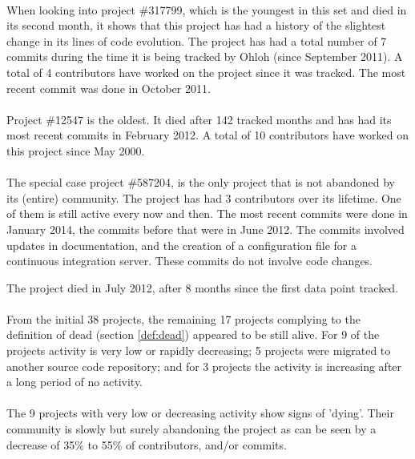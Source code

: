 \paragraph{}
When looking into project \#317799, which is the youngest in this set and died
in its second month, it shows that this project has had a history of the slightest
change in its lines of code evolution. The project has had a total number of 7
commits during the time it is being tracked by Ohloh (since September 2011). A
total of 4 contributors have worked on the project since it was tracked. The
most recent commit was done in October 2011.

\paragraph{}
Project \#12547 is the oldest. It died after 142 tracked months and has
had its most recent commits in February 2012. A total of 10 contributors have
worked on this project since May 2000.

\paragraph{}
The special case project \#587204, is the only project that is not
abandoned by its (entire) community. The project has had 3 contributors over its
lifetime. One of them is still active every now and then. The most recent
commits were done in January 2014, the commits before that were in June 2012.
The commits involved updates in documentation, and the creation of a
configuration file for a continuous integration server. These commits do not
involve code changes.

The project died in July 2012, after 8 months since the first data point
tracked.

\paragraph{}
From the initial 38 projects, the remaining 17 projects complying to the
definition of dead (section \ref{def:dead}) appeared to be still alive. For 9
of the projects activity is very low or rapidly decreasing; 5 projects were
migrated to another source code repository; and for 3 projects the activity is
increasing after a long period of no activity.

\paragraph{}
The 9 projects with very low or decreasing activity show signs of 'dying'. Their
community is slowly but surely abandoning the project as can be seen by a
decrease of 35\% to 55\% of contributors, and/or commits.

